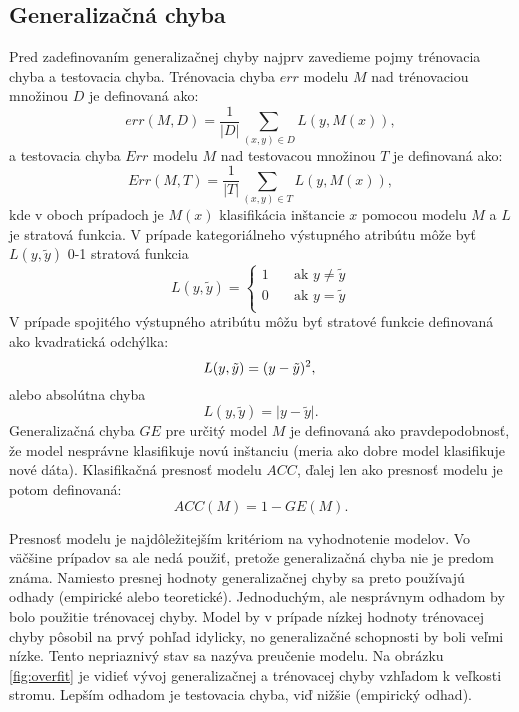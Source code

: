 \subsection{Generalizačná chyba}\label{kap1:2.6:2.6.1:Generalize}
Pred zadefinovaním generalizačnej chyby najprv zavedieme pojmy trénovacia chyba a testovacia chyba.
Trénovacia chyba $err$ modelu $M$ nad trénovaciou množinou $D$ je definovaná ako:
\begin{equation}
err(M,D) = \dfrac{1}{\lvert D \lvert}\sum_{(x,y) \in D} L(y, M(x)),
\end{equation}
a testovacia chyba $Err$ modelu $M$ nad testovacou množinou $T$ je definovaná ako:
\begin{equation}
Err(M,T) = \dfrac{1}{\lvert T \lvert}\sum_{(x,y) \in T} L(y, M(x)),
\end{equation}
kde v oboch prípadoch je $M(x)$ klasifikácia inštancie $x$ pomocou modelu $M$ a $L$ je stratová funkcia. V prípade kategoriálneho výstupného atribútu môže byť $L(y,\tilde{y})$ 0-1 stratová funkcia
\begin{equation}
L(y,\tilde{y}) = 
\begin{cases}
1 & \quad \text{ak } y \ne \tilde{y}\\
0 & \quad \text{ak } y = \tilde{y}\\
\end{cases}
\end{equation}
V prípade spojitého výstupného atribútu môžu byť stratové funkcie definovaná ako kvadratická odchýlka:
\begin{equation}
L(y,\tilde{y}) = (y - \tilde{y})^2, \\
\end{equation}
alebo absolútna chyba
\begin{equation}
L(y,\tilde{y}) = \lvert y - \tilde{y} \lvert.
\end{equation}
Generalizačná chyba $GE$ pre určitý model $M$ je definovaná ako pravdepodobnosť, že model nesprávne klasifikuje novú inštanciu (meria ako dobre model klasifikuje nové dáta). Klasifikačná presnosť modelu $ACC$, ďalej len ako presnosť modelu je potom definovaná:
\begin{equation}
ACC(M) = 1 - GE(M).
\end{equation}

Presnosť modelu je najdôležitejším kritériom na vyhodnotenie modelov. Vo väčšine prípadov sa ale nedá použiť, pretože generalizačná chyba nie je predom známa. Namiesto presnej hodnoty generalizačnej chyby sa preto používajú odhady (empirické alebo teoretické). Jednoduchým, ale nesprávnym odhadom by bolo použitie trénovacej chyby. Model by v prípade nízkej hodnoty trénovacej chyby pôsobil na prvý pohľad idylicky, no generalizačné schopnosti by boli veľmi nízke. Tento nepriaznivý stav sa nazýva preučenie modelu. Na obrázku \ref{fig:overfit} je vidieť vývoj generalizačnej a trénovacej chyby vzhľadom k veľkosti stromu. Lepším odhadom je testovacia chyba, viď nižšie (empirický odhad).

